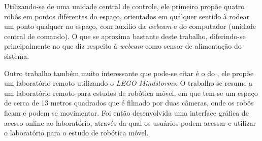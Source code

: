 Utilizando-se de uma unidade central de controle, ele primeiro propõe quatro robôs em pontos diferentes do espaço, orientados em qualquer sentido à rodear um ponto qualquer no espaço, com auxilio da \emph{webcam} e do computador (unidade central de comando). O que se aproxima bastante deste trabalho, diferindo-se principalmente no que diz respeito à \emph{webcam} como sensor de alimentação do sistema.

Outro trabalho também muito interessante que pode-se citar é o do , ele propõe um laboratório remoto utilizando o \emph{LEGO  Mindstorms\textregistered}. O trabalho se resume  a um laboratório remoto para estudos de robótica móvel, em que tem-se um espaço de cerca de 13 metros quadrados que é filmado por duas câmeras, onde os robôs ficam e podem se movimentar. Foi então desenvolvida uma interface gráfica de acesso online ao laboratório, através da qual os usuários podem acessar e utilizar o laboratório para o estudo de robótica móvel. 

